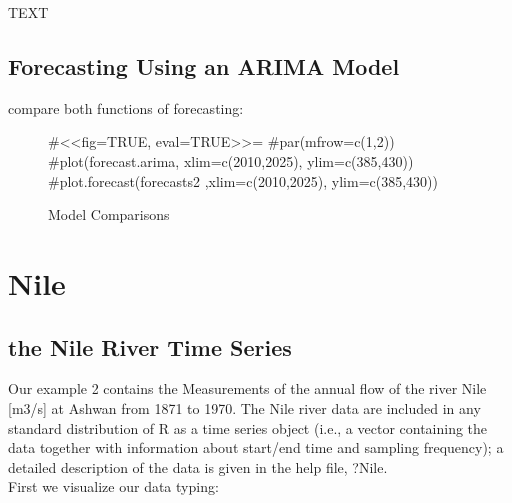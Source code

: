 \documentclass[11pt, a4paper]{article} %
\begin{document}
TEXT
\subsection{Forecasting Using an ARIMA Model}%
compare both functions of forecasting:
\begin{figure}[H]
\centering
#<<fig=TRUE, eval=TRUE>>=
#par(mfrow=c(1,2))
#plot(forecast.arima, xlim=c(2010,2025), ylim=c(385,430))
#plot.forecast(forecasts2 ,xlim=c(2010,2025), ylim=c(385,430))
\caption{Model Comparisons}
\end{figure}

\section{Nile}
\subsection{the Nile River Time Series} 

\noindent Our example 2 contains the Measurements of the annual flow of the river Nile [m3/s] at Ashwan from 1871 to 1970. The Nile river data are included in any standard distribution of R as a time series object (i.e., a vector containing the data together with information about start/end time and sampling frequency); a detailed description of the data is given in the help file, ?Nile. \\
First we visualize our data typing:
\end{document}
